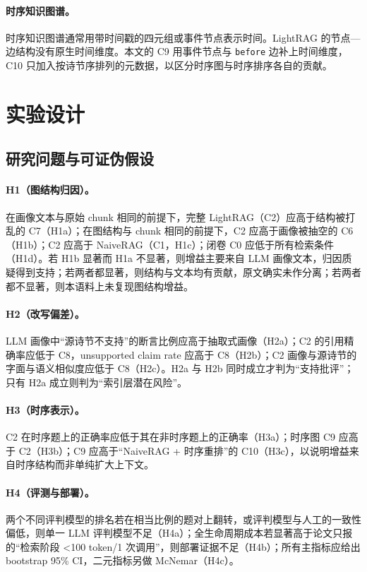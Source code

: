 \documentclass[11pt,a4paper]{ctexart}
\begin{document}
\paragraph{时序知识图谱。}
时序知识图谱通常用带时间戳的四元组或事件节点表示时间\citep{cai2022temporal}。LightRAG 的节点—边结构没有原生时间维度。本文的 C9 用事件节点与 \texttt{before} 边补上时间维度，C10 只加入按诗节序排列的元数据，以区分时序图与时序排序各自的贡献。

\section{实验设计}
\label{sec:design}

\subsection{研究问题与可证伪假设}

\paragraph{H1（图结构归因）。}
在画像文本与原始 chunk 相同的前提下，完整 LightRAG（C2）应高于结构被打乱的 C7（H1a）；在图结构与 chunk 相同的前提下，C2 应高于画像被抽空的 C6（H1b）；C2 应高于 NaiveRAG（C1，H1c）；闭卷 C0 应低于所有检索条件（H1d）。若 H1b 显著而 H1a 不显著，则增益主要来自 LLM 画像文本，归因质疑得到支持；若两者都显著，则结构与文本均有贡献，原文确实未作分离；若两者都不显著，则本语料上未复现图结构增益。

\paragraph{H2（改写偏差）。}
LLM 画像中“源诗节不支持”的断言比例应高于抽取式画像（H2a）；C2 的引用精确率应低于 C8，unsupported claim rate 应高于 C8（H2b）；C2 画像与源诗节的字面与语义相似度应低于 C8（H2c）。H2a 与 H2b 同时成立才判为“支持批评”；只有 H2a 成立则判为“索引层潜在风险”。

\paragraph{H3（时序表示）。}
C2 在时序题上的正确率应低于其在非时序题上的正确率（H3a）；时序图 C9 应高于 C2（H3b）；C9 应高于“NaiveRAG + 时序重排”的 C10（H3c），以说明增益来自时序结构而非单纯扩大上下文。

\paragraph{H4（评测与部署）。}
两个不同评判模型的排名若在相当比例的题对上翻转，或评判模型与人工的一致性偏低，则单一 LLM 评判模型不足（H4a）；全生命周期成本若显著高于论文只报的“检索阶段 <100 token/1 次调用”，则部署证据不足（H4b）；所有主指标应给出 bootstrap 95\% CI，二元指标另做 McNemar（H4c）。
\end{document}
